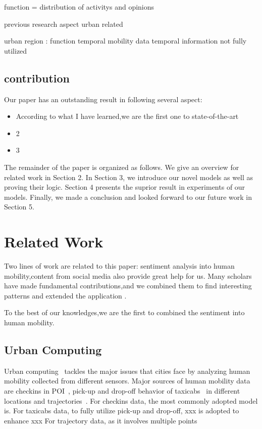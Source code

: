 \documentclass[runningheads]{llncs}
\begin{document}
function = distribution of activitys and opinions


previous research
aspect urban related





urban region : function temporal 
mobility data temporal information not fully utilized 


\subsection{contribution}
Our paper has an outstanding result in following several aspect:
\begin{itemize}
  \item According to what I have learned,we are the first one to state-of-the-art
  \item 2
  \item 3
\end{itemize}




The remainder of the paper is organized as follows. 
We give an overview for related work in Section 2.
In Section 3, we introduce our novel models as well as proving their logic.
Section 4 presents the suprior result in experiments of our models.
Finally, we made a conclusion and looked forward to our future work in Section 5.

\section{Related Work}

Two lines of work are related to this paper: sentiment analysis into human mobility,content from social media also provide great help for us. Many scholars have made fundamental contributions,and we combined them to find interesting patterns and extended the application .

To the best of our knowledges,we are the first to combined the sentiment into human mobility.

\subsection{Urban Computing}

Urban computing~\cite{Zheng2014UrbanConcepts} tackles the major issues that cities face by analyzing human mobility collected from different sensors.  
Major sources of human mobility data are checkins in POI~\cite{}, pick-up and drop-off behavior of taxicabs~\cite{} in different locations and  trajectories~\cite{}.
For checkins data, the most commonly adopted model is.
For taxicabs data, to fully utilize pick-up and drop-off, xxx is adopted to enhance xxx
For trajectory data, as it involves multiple points 
\end{document}
